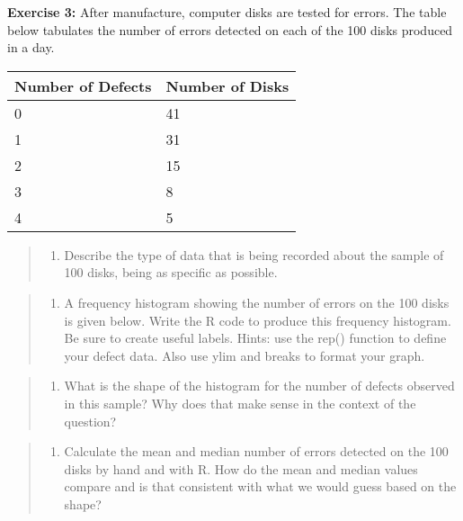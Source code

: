 \documentclass[
]{article}
\providecommand{\tightlist}{%
  \setlength{\itemsep}{0pt}\setlength{\parskip}{0pt}}
\begin{document}
\vspace{1cm}

\textbf{Exercise 3:} After manufacture, computer disks are tested for
errors. The table below tabulates the number of errors detected on each
of the 100 disks produced in a day.

\begin{longtable}[]{@{}ll@{}}
\toprule()
Number of Defects & Number of Disks \\
\midrule()
\endhead
0 & 41 \\
1 & 31 \\
2 & 15 \\
3 & 8 \\
4 & 5 \\
\bottomrule()
\end{longtable}

\begin{quote}
\begin{enumerate}
\def\labelenumi{\alph{enumi}.}
\tightlist
\item
  Describe the type of data that is being recorded about the sample of
  100 disks, being as specific as possible.
\end{enumerate}
\end{quote}

\begin{quote}
\begin{enumerate}
\def\labelenumi{\alph{enumi}.}
\setcounter{enumi}{1}
\tightlist
\item
  A frequency histogram showing the number of errors on the 100 disks is
  given below. Write the R code to produce this frequency histogram. Be
  sure to create useful labels. Hints: use the rep() function to define
  your defect data. Also use ylim and breaks to format your graph.
\end{enumerate}
\end{quote}

\begin{quote}
\begin{enumerate}
\def\labelenumi{\alph{enumi}.}
\setcounter{enumi}{2}
\tightlist
\item
  What is the shape of the histogram for the number of defects observed
  in this sample? Why does that make sense in the context of the
  question?
\end{enumerate}
\end{quote}

\begin{quote}
\begin{enumerate}
\def\labelenumi{\alph{enumi}.}
\setcounter{enumi}{3}
\tightlist
\item
  Calculate the mean and median number of errors detected on the 100
  disks by hand and with R. How do the mean and median values compare
  and is that consistent with what we would guess based on the shape?
\end{enumerate}
\end{quote}
\end{document}
